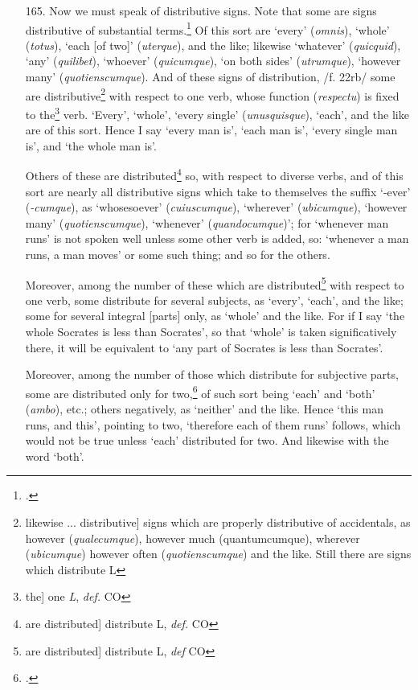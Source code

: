 \begin{itemize}
\item[165.] Now we must speak of distributive signs. Note that some are signs distributive of substantial terms.\footnote{\cite[p. 256.29]{BurleyDPAL}.} Of this sort are `every' (\textit{omnis}), `whole' (\textit{totus}), `each [of two]' (\textit{uterque}), and the like; likewise `whatever' (\textit{quicquid}), `any' (\textit{quilibet}), `whoever' (\textit{quicumque}), `on both sides' (\textit{utrumque}), `however many' (\textit{quotienscumque}). And of these signs of distribution, /f. 22rb/ some are distributive\footnote{likewise ... distributive] signs which are properly distributive of accidentals, as however (\textit{qualecumque}), however much (quantumcumque), wherever (\textit{ubicumque}) however often (\textit{quotienscumque}) and the like. Still there are signs which distribute L} with respect to one verb, whose function (\textit{respectu}) is fixed to the\footnote{the] one \textit{L}, \textit{def.} CO} verb. `Every', `whole', `every single' (\textit{unusquisque}), `each', and the like are of this sort. Hence I say `every man is', `each man is', `every single man is', and `the whole man is'. 

Others of these are distributed\footnote{are distributed] distribute L, \textit{def.} CO} so, with respect to diverse verbs, and of this sort are nearly all distributive signs which take to themselves the suffix `-ever' (\textit{-cumque}), as `whosesoever' (\textit{cuiuscumque}), `wherever' (\textit{ubicumque}), `however many' (\textit{quotienscumque}), `whenever' (\textit{quandocumque})'; for `whenever man runs' is not spoken well unless some other verb is added, so: `whenever a man runs, a man moves' or some such thing; and so for the others. 

Moreover, among the number of these which are distributed\footnote{are distributed] distribute L, \textit{def} CO} with respect to one verb, some distribute for several subjects, as `every', `each', and the like; some for several integral [parts] only, as `whole' and the like. For if I say `the whole Socrates is less than Socrates', so that `whole' is taken significatively there, it will be equivalent to `any part of Socrates is less than Socrates'. 

Moreover, among the number of those which distribute for subjective parts, some are distributed only for two,\footnote{\cite[p. 255.8]{BurleyDPAL}.} of such sort being `each' and `both' (\textit{ambo}), etc.; others negatively, as `neither' and the like. Hence `this man runs, and this', pointing to two, `therefore each of them runs' follows, which would not be true unless `each' distributed for two. And likewise with the word `both'. 


\end{itemize}
